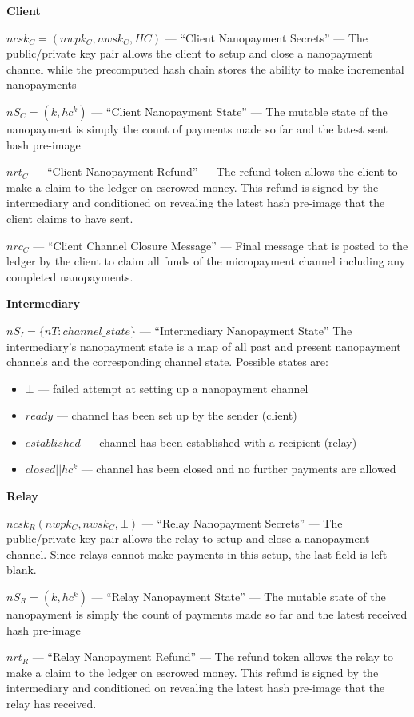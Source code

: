 \documentclass{article}
\begin{document}
\textbf{Client}

$ncsk_C = (nwpk_C, nwsk_C, HC)$ --- ``Client Nanopayment Secrets'' --- The
public/private key pair allows the client to setup and close a
nanopayment channel while the precomputed hash chain stores the
ability to make incremental nanopayments

$nS_C = (k, hc^k)$ --- ``Client Nanopayment State'' --- The mutable state
of the nanopayment is simply the count of payments made so far and the
latest sent hash pre-image

$nrt_C$ --- ``Client Nanopayment Refund'' --- The refund token allows the
client to make a claim to the ledger on escrowed money. This refund is
signed by the intermediary and conditioned on revealing the latest
hash pre-image that the client claims to have sent.

$nrc_C$ --- ``Client Channel Closure Message'' --- Final message that is
posted to the ledger by the client to claim all funds of the
micropayment channel including any completed nanopayments.

\textbf{Intermediary}

$nS_I = \{nT: channel\_state\}$ --- ``Intermediary Nanopayment State''
The intermediary's nanopayment state is a map of all past and present
nanopayment channels and the corresponding channel state. Possible
states are:
\begin{itemize}
\item $\bot$ --- failed attempt at setting up a nanopayment channel
\item $ready$ --- channel has been set up by the sender (client)
\item $established$ --- channel has been established with a recipient
  (relay)
\item $closed||hc^k$ --- channel has been closed and no further payments
  are allowed
\end{itemize}

\textbf{Relay}

$ncsk_R (nwpk_C, nwsk_C, \bot)$ --- ``Relay Nanopayment Secrets'' --- The
public/private key pair allows the relay to setup and close a
nanopayment channel. Since relays cannot make payments in this setup,
the last field is left blank.

$nS_R = (k, hc^k)$ --- ``Relay Nanopayment State'' --- The mutable state
of the nanopayment is simply the count of payments made so far and the
latest received hash pre-image

$nrt_R$ --- ``Relay Nanopayment Refund'' --- The refund token allows the
relay to make a claim to the ledger on escrowed money. This refund is
signed by the intermediary and conditioned on revealing the latest
hash pre-image that the relay has received.
\end{document}
